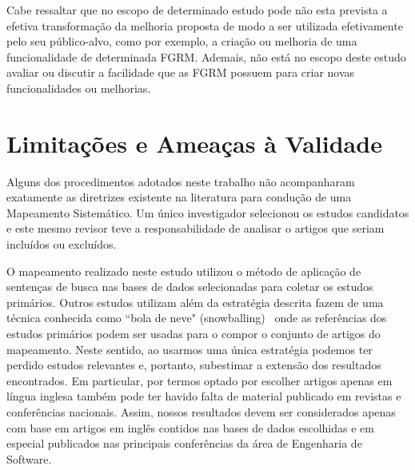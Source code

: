 
Cabe ressaltar que no escopo de determinado estudo pode não esta prevista a
efetiva transformação da melhoria proposta de modo a ser utilizada efetivamente
pelo seu público-alvo, como por exemplo, a criação ou melhoria de uma
funcionalidade de determinada FGRM\@. Ademais, não está no escopo deste estudo
avaliar ou discutir a facilidade que as FGRM possuem para criar novas
funcionalidades ou melhorias. 




\section{Limitações e Ameaças à Validade} 
\label{sec:map_limitacoes_ameacas}

Alguns dos procedimentos adotados neste trabalho não acompanharam exatamente as
diretrizes existente na literatura para condução de uma Mapeamento Sistemático.
Um único investigador selecionou os estudos candidatos e este mesmo revisor teve
a responsabilidade de analisar o artigos que seriam incluídos ou excluídos.

O mapeamento realizado neste estudo utilizou o método de aplicação de sentenças
de busca nas bases de dados selecionadas para coletar os estudos primários.
Outros estudos utilizam além da estratégia descrita fazem de uma técnica
conhecida  como ``bola de neve" (snowballing)~\cite{wohlin2014guidelines} onde
as referências dos estudos primários podem ser usadas para o compor o conjunto
de artigos do mapeamento. Neste sentido, ao usarmos uma única estratégia podemos
ter perdido estudos relevantes e, portanto, subestimar a extensão dos resultados
encontrados. Em particular, por termos optado por escolher artigos apenas em
língua inglesa também pode ter havido falta de material publicado em revistas e
conferências nacionais. Assim, nossos resultados devem ser considerados apenas
com base em artigos em inglês contidos nas bases de dados escolhidas  e em
especial publicados nas principais conferências da área de Engenharia de
Software.

